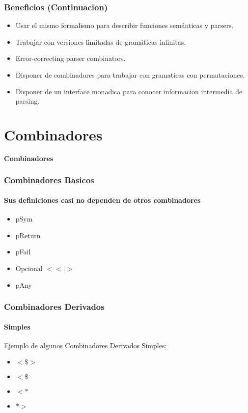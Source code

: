 \documentclass[12pt]{beamer}
\begin{document}
\begin{frame}
\frametitle{Beneficios (Continuacion)}
	\begin{itemize}
        \item Usar el mismo formalismo para describir funciones semánticas y parsers.
        \item Trabajar con versiones limitadas de gramáticas infinitas.
        \item Error-correcting parser combinators.
        \item Disponer de combinadores para trabajar con gramaticas con permutaciones.
        \item Disponer de un interface monadica para conocer informacion intermedia de parsing.
	\end{itemize}
\end{frame}


\section{Combinadores}

\begin{frame}
\begin{center}
	\textbf{\Large Combinadores}
\end{center}
\end{frame}

\begin{frame}
\frametitle{Combinadores Basicos}
\framesubtitle{Sus definiciones casi no dependen de otros combinadores}
    \begin{itemize}
        \item pSym
        \item pReturn
        \item pFail
        \item Opcional $<<|>$
        \item pAny
	\end{itemize}
\end{frame}

\begin{frame}
\frametitle{Combinadores Derivados}
\framesubtitle{Simples}
Ejemplo de algunos Combinadores Derivados Simples:
    \begin{itemize}
        \item $<\$>$
        \item $<\$$
        \item $<*$
        \item $*>$
	\end{itemize}
\end{frame}
\end{document}
